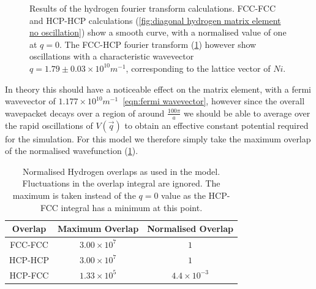 \begin{figure}[htb]
\begin{subfigure}{0.45\linewidth}
    \label{fig:cross hydrogen matrix element oscillation}
  \end{subfigure}
  \caption{Results of the hydrogen fourier transform calculations.
  FCC-FCC and HCP-HCP calculations
  (\cref{fig:diagonal hydrogen matrix element no oscillation})
  show a smooth curve, with a normalised
  value of one at \(q=0\).
  The FCC-HCP fourier transform
  (\cref{fig:cross hydrogen matrix element oscillation})
  however show oscillations with a characteristic
  wavevector \(q = 1.79 \pm 0.03 \times{}10^{10}m^{-1}\),
  corresponding to the lattice vector of \(Ni\).}\label{fig:fourier transform oscillation}
\end{figure}
In theory this should have a noticeable
effect on the matrix element, with a
fermi wavevector of
\(1.177\times{}10^{10} m^{-1}\)~\cref{eqn:fermi wavevector},
however since the overall wavepacket decays over a region
of around \(\frac{100\pi}{a}\) we should be
able to average over the rapid oscillations of
\(V(\vec{q})\) to obtain an effective constant
potential required for the simulation. For this
model we therefore simply take the maximum overlap
of the normalised wavefunction (\cref{tab:hydrogen overlaps}).
\begin{table}[htb]
  \begin{center}
    \begin{tabular}{ *{3}{c} }
      \toprule
      Overlap & Maximum Overlap        & Normalised Overlap     \\
      \midrule
      FCC-FCC & \(3.00\times{}10^{7}\) & \(1\)                  \\
      HCP-HCP & \(3.00\times{}10^{7}\) & \(1\)                  \\
      HCP-FCC & \(1.33\times{}10^{5}\) & \(4.4\times{}10^{-3}\) \\
      \bottomrule
    \end{tabular}
  \end{center}
  \caption{Normalised Hydrogen overlaps as used in the
    model. Fluctuations in the overlap
    integral are ignored. The maximum
    is taken instead of the \(q=0\) value as the HCP-FCC integral
    has a minimum at this point.}\label{tab:hydrogen overlaps}
\end{table}

